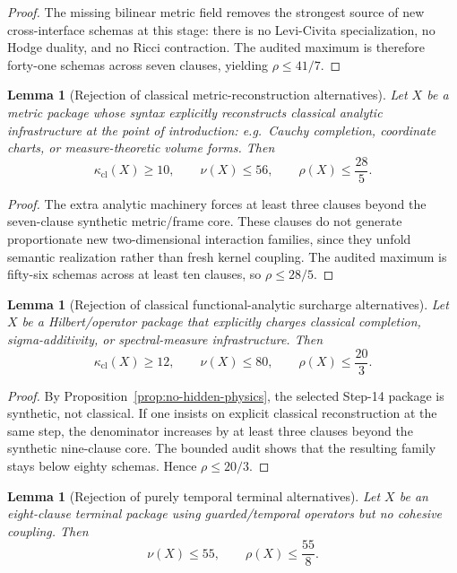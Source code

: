 \documentclass{lmcs}
\theoremstyle{plain}
\newtheorem{lem}[thm]{Lemma}
\theoremstyle{definition}
\theoremstyle{remark}
\begin{document}
\begin{proof}
The missing bilinear metric field removes the strongest source of new cross-interface schemas at this stage: there is no Levi-Civita specialization, no Hodge duality, and no Ricci contraction.
The audited maximum is therefore forty-one schemas across seven clauses, yielding $\rho\le 41/7$.
\end{proof}

\begin{lem}[Rejection of classical metric-reconstruction alternatives]
\label{lem:reject-classical-metric}
Let $X$ be a metric package whose syntax explicitly reconstructs classical analytic infrastructure at the point of introduction: e.g.\ Cauchy completion, coordinate charts, or measure-theoretic volume forms.
Then
\[
  \kappa_{\mathrm{cl}}(X)\ge 10,\qquad \nu(X)\le 56,\qquad \rho(X)\le \frac{28}{5}.
\]
\end{lem}

\begin{proof}
The extra analytic machinery forces at least three clauses beyond the seven-clause synthetic metric/frame core.
These clauses do not generate proportionate new two-dimensional interaction families, since they unfold semantic realization rather than fresh kernel coupling.
The audited maximum is fifty-six schemas across at least ten clauses, so $\rho\le 28/5$.
\end{proof}

\begin{lem}[Rejection of classical functional-analytic surcharge alternatives]
\label{lem:reject-classical-hilbert}
Let $X$ be a Hilbert/operator package that explicitly charges classical completion, sigma-additivity, or spectral-measure infrastructure.
Then
\[
  \kappa_{\mathrm{cl}}(X)\ge 12,\qquad \nu(X)\le 80,\qquad \rho(X)\le \frac{20}{3}.
\]
\end{lem}

\begin{proof}
By Proposition~\ref{prop:no-hidden-physics}, the selected Step-14 package is synthetic, not classical.
If one insists on explicit classical reconstruction at the same step, the denominator increases by at least three clauses beyond the synthetic nine-clause core.
The bounded audit shows that the resulting family stays below eighty schemas.
Hence $\rho\le 20/3$.
\end{proof}

\begin{lem}[Rejection of purely temporal terminal alternatives]
\label{lem:reject-pure-temporal}
Let $X$ be an eight-clause terminal package using guarded/temporal operators but no cohesive coupling.
Then
\[
  \nu(X)\le 55,\qquad \rho(X)\le \frac{55}{8}.
\]
\end{lem}
\end{document}
